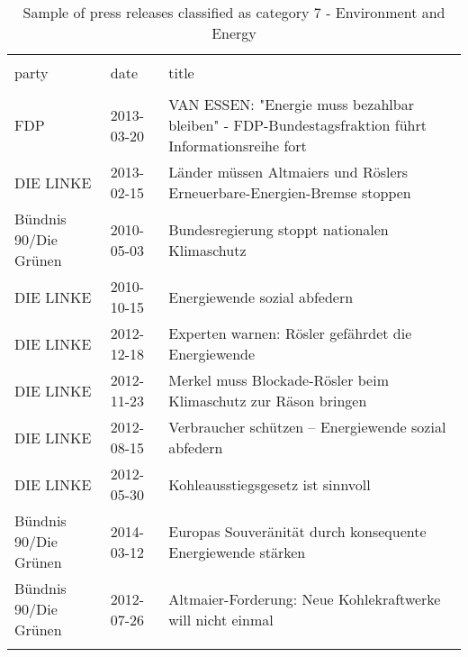 
\begin{table}[!htbp] \centering 
  \caption{Sample of press releases classified as category 7 - Environment and Energy} 
  \label{tab:7-document-samples} 
\begin{tabularx}{\textwidth}{XXl} 
\\[-1.8ex]\hline 
\hline \\[-1.8ex] 
party & date & title \\ 
\hline \\[-1.8ex] 
FDP & 2013-03-20 & VAN ESSEN: "Energie muss bezahlbar bleiben" - FDP-Bundestagsfraktion führt Informationsreihe fort \\ 
DIE LINKE & 2013-02-15 & Länder müssen Altmaiers und Röslers Erneuerbare-Energien-Bremse stoppen \\ 
Bündnis 90/Die Grünen & 2010-05-03 & Bundesregierung stoppt nationalen Klimaschutz \\ 
DIE LINKE & 2010-10-15 & Energiewende sozial abfedern \\ 
DIE LINKE & 2012-12-18 & Experten warnen: Rösler gefährdet die Energiewende \\ 
DIE LINKE & 2012-11-23 & Merkel muss Blockade-Rösler beim Klimaschutz zur Räson bringen \\ 
DIE LINKE & 2012-08-15 & Verbraucher schützen – Energiewende sozial abfedern \\ 
DIE LINKE & 2012-05-30 & Kohleausstiegsgesetz ist sinnvoll \\ 
Bündnis 90/Die Grünen & 2014-03-12 & Europas Souveränität durch konsequente Energiewende stärken \\ 
Bündnis 90/Die Grünen & 2012-07-26 & Altmaier-Forderung: Neue Kohlekraftwerke will nicht einmal \\ 
\hline \\[-1.8ex] 
\end{tabularx} 
\end{table} 
